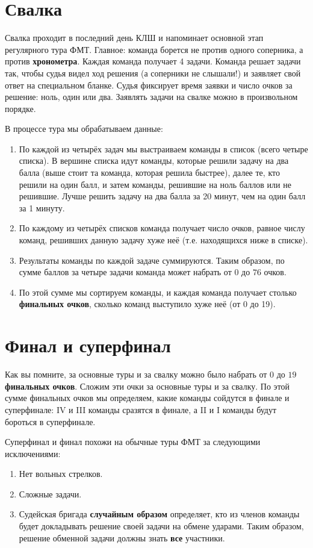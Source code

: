 \documentclass[a4paper, 12pt]{article}
\theoremstyle{break}
\begin{document}
\thispagestyle{empty}
\section*{Свалка}
Свалка проходит в последний день КЛШ и напоминает основной этап регулярного тура ФМТ.
Главное: команда борется не против одного соперника, а против {\bf хронометра}.
Каждая команда получает 4 задачи. Команда решает задачи так, чтобы судья
видел ход решения (а соперники не слышали!) и заявляет свой ответ на специальном бланке.
Судья фиксирует время заявки и число очков за решение: ноль, один или два.
Заявлять задачи на свалке можно в произвольном порядке.

В процессе тура мы обрабатываем данные:
\begin{enumerate}
\item По каждой из четырёх задач мы выстраиваем команды в список (всего четыре списка).
В вершине списка идут команды, которые решили задачу на два балла
(выше стоит та команда, которая решила быстрее), далее те, кто решили на один балл,
и затем команды, решившие на ноль баллов или не решившие. Лучше решить задачу
на два балла за 20 минут, чем на один балл за 1 минуту.
\item По каждому из четырёх списков команда получает число очков, равное числу команд,
решивших данную задачу хуже неё (т.е. находящихся ниже в списке).
\item Результаты команды по каждой задаче суммируются. Таким образом,
по сумме баллов за четыре задачи команда может набрать от $0$ до $76$ очков.
\item По этой сумме мы сортируем команды, и каждая команда получает столько {\bf финальных очков},
сколько команд выступило хуже неё (от 0 до 19).
\end{enumerate}

\section*{Финал и суперфинал}
Как вы помните, за основные туры и за свалку можно было набрать от $0$ до $19$ {\bf финальных очков}.
Сложим эти очки за основные туры и за свалку. По этой сумме финальных очков
мы определяем, какие команды сойдутся в финале и суперфинале: IV и III команды сразятся в финале,
а II и I команды будут бороться в суперфинале.

Суперфинал и финал похожи на обычные туры ФМТ за следующими исключениями:
\begin{enumerate}
\item Нет вольных стрелков.
\item Сложные задачи.
\item Судейская бригада {\bf случайным образом} определяет, кто из членов команды
будет докладывать решение своей задачи на обмене ударами. Таким образом,
решение обменной задачи должны знать {\bf все} участники.
\end{enumerate}
\end{document}
